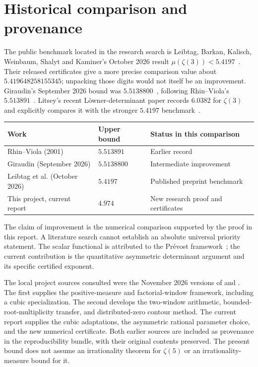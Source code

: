 \documentclass[11pt]{article}
\theoremstyle{definition}\newtheorem{definition}[theorem]{Definition}
\theoremstyle{remark}\newtheorem{remark}[theorem]{Remark}
\begin{document}
\section{Historical comparison and provenance}\label{sec:history}
The public benchmark located in the research search is Leibtag, Barkan, Kalisch, Weinbaum, Shalyt and Kaminer's October 2026 result $\mu(\zeta(3))<5.4197$~\cite{leibtag}. Their released certificates give a more precise comparison value about $5.419648258155345$; unpacking those digits would not itself be an improvement. Giraudin's September 2026 bound was $5.5138800$~\cite{giraudin}, following Rhin--Viola's $5.513891$~\cite{rv}. Litsey's recent L\"owner-determinant paper records $6.0382$ for $\zeta(3)$ and explicitly compares it with the stronger $5.4197$ benchmark~\cite{litsey}.
\begin{center}
\begin{tabular}{@{}lll@{}}
\toprule
Work & Upper bound & Status in this comparison\\
\midrule
Rhin--Viola (2001) & $5.513891$ & Earlier record\\
Giraudin (September 2026) & $5.5138800$ & Intermediate improvement\\
Leibtag et al. (October 2026) & $5.4197$ & Published preprint benchmark\\
This project, current report & $4.974$ & New research proof and certificates\\
\bottomrule
\end{tabular}
\end{center}
The claim of improvement is the numerical comparison supported by the proof in this report. A literature search cannot establish an absolute universal priority statement. The scalar functional is attributed to the Pr\'evost framework~\cite{prevost}; the current contribution is the quantitative asymmetric determinant argument and its specific certified exponent.

The local project sources consulted were the November 2026 versions of  and . The first supplies the positive-measure and factorial-window framework, including a cubic specialization. The second develops the two-window arithmetic, bounded-root-multiplicity transfer, and distributed-zero contour method. The current report supplies the cubic adaptations, the asymmetric rational parameter choice, and the new numerical certificate. Both earlier sources are included as provenance in the reproducibility bundle, with their original contents preserved. The present bound does not assume an irrationality theorem for $\zeta(5)$ or an irrationality-measure bound for it.
\end{document}
